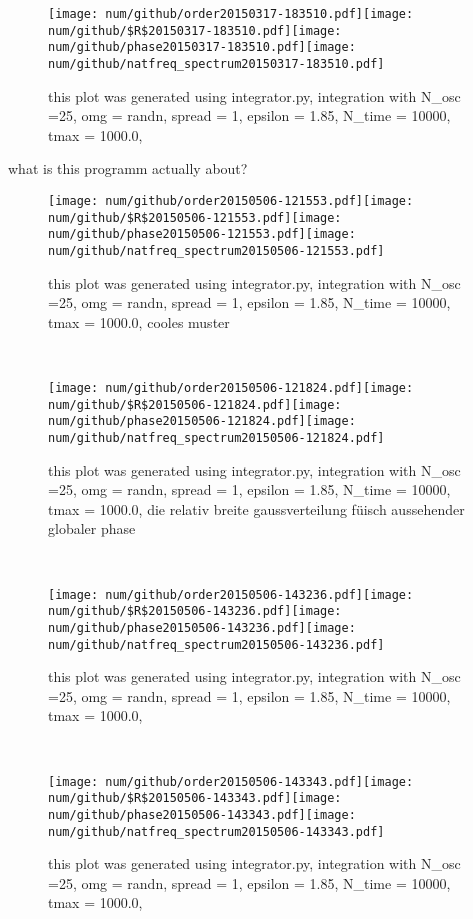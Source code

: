 
\begin{figure}[h!]\centering\texttt{[image: num/github/order20150317-183510.pdf]}\texttt{[image: num/github/\$R\$20150317-183510.pdf]}\texttt{[image: num/github/phase20150317-183510.pdf]}\texttt{[image: num/github/natfreq\_spectrum20150317-183510.pdf]}\caption{this plot was generated using integrator.py, integration with N\_osc =25, omg = randn, spread = 1, epsilon = 1.85, N\_time = 10000, tmax = 1000.0, }\end{figure}
what is this programm actually about?\\ 
\begin{figure}[h!]\centering\texttt{[image: num/github/order20150506-121553.pdf]}\texttt{[image: num/github/\$R\$20150506-121553.pdf]}\texttt{[image: num/github/phase20150506-121553.pdf]}\texttt{[image: num/github/natfreq\_spectrum20150506-121553.pdf]}\caption{this plot was generated using integrator.py, integration with N\_osc =25, omg = randn, spread = 1, epsilon = 1.85, N\_time = 10000, tmax = 1000.0, cooles muster}\end{figure}
\\ 
\begin{figure}[h!]\centering\texttt{[image: num/github/order20150506-121824.pdf]}\texttt{[image: num/github/\$R\$20150506-121824.pdf]}\texttt{[image: num/github/phase20150506-121824.pdf]}\texttt{[image: num/github/natfreq\_spectrum20150506-121824.pdf]}\caption{this plot was generated using integrator.py, integration with N\_osc =25, omg = randn, spread = 1, epsilon = 1.85, N\_time = 10000, tmax = 1000.0, die relativ breite gaussverteilung füisch aussehender globaler phase}\end{figure}
\\ 
\begin{figure}[h!]\centering\texttt{[image: num/github/order20150506-143236.pdf]}\texttt{[image: num/github/\$R\$20150506-143236.pdf]}\texttt{[image: num/github/phase20150506-143236.pdf]}\texttt{[image: num/github/natfreq\_spectrum20150506-143236.pdf]}\caption{this plot was generated using integrator.py, integration with N\_osc =25, omg = randn, spread = 1, epsilon = 1.85, N\_time = 10000, tmax = 1000.0, }\end{figure}
\\ 
\begin{figure}[h!]\centering\texttt{[image: num/github/order20150506-143343.pdf]}\texttt{[image: num/github/\$R\$20150506-143343.pdf]}\texttt{[image: num/github/phase20150506-143343.pdf]}\texttt{[image: num/github/natfreq\_spectrum20150506-143343.pdf]}\caption{this plot was generated using integrator.py, integration with N\_osc =25, omg = randn, spread = 1, epsilon = 1.85, N\_time = 10000, tmax = 1000.0, }\end{figure}
